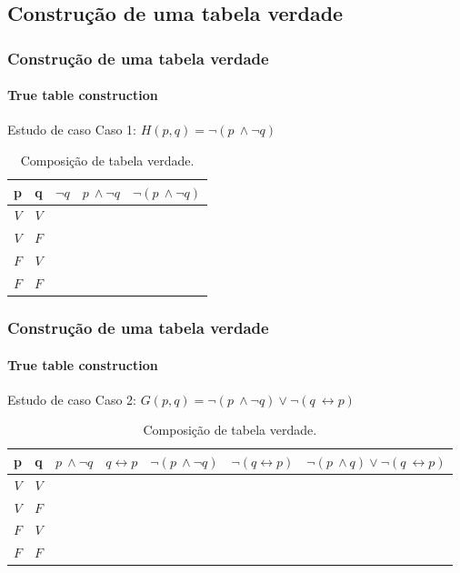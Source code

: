 \subsection{Construção de uma tabela verdade}
%
{
\begin{frame}[t]
    \frametitle{Construção de uma tabela verdade}
    \framesubtitle{True table construction}
    \begin{exampleblock}{Estudo de caso}
        Caso 1: $H(p,q) = \lnot (p~\land \lnot q)$
    \end{exampleblock}
    \begin{table}[T]
        \caption{Composição de tabela verdade.}
        \label{tab:tabela-caso-1}
        \begin{tabular}{|c|c|c|l|l|}
            \hline
            \rowcolor[HTML]{EFEFEF} 
            \textbf{p} & \textbf{q} & \textbf{$\lnot q$} & \textbf{$p~\land \lnot q$} & \textbf{$\lnot (p~\land \lnot q)$} \\ \hline
            $V$ & $V$ &  &  &  \\ \hline
            $V$ & $F$ &  &  &  \\ \hline
            $F$ & $V$ &  &  &  \\ \hline
            $F$ & $F$ &  &  &  \\ \hline
        \end{tabular}
    \end{table}
\end{frame}
}
%
\begin{frame}[t]
    \frametitle{Construção de uma tabela verdade}
    \framesubtitle{True table construction}
    \begin{exampleblock}{Estudo de caso}
        Caso 2: $G(p,q) = \lnot (p~\land \lnot q) \lor \lnot (q~\leftrightarrow p)$
    \end{exampleblock}
    \begin{table}[ht]
        \footnotesize
        \caption{Composição de tabela verdade.}
        \label{tab:tabela-caso-2}
        \begin{tabular}{|c|c|c|l|l|l|l|}
            \hline
            \rowcolor[HTML]{EFEFEF} 
            \textbf{p} &
            \textbf{q} &
            \textbf{$p~\land \lnot q$} &
            \textbf{$q \leftrightarrow p$} &
            \textbf{$\lnot (p~\land \lnot q)$} &
            \textbf{$\lnot (q \leftrightarrow p)$} &
            \textbf{$\lnot (p~\land q) \lor \lnot (q~\leftrightarrow p)$} \\ \hline
            $V$ & $V$ &  &  &  &  &  \\ \hline
            $V$ & $F$ &  &  &  &  &  \\ \hline
            $F$ & $V$ &  &  &  &  &  \\ \hline
            $F$ & $F$ &  &  &  &  &  \\ \hline
        \end{tabular}
    \end{table}
\end{frame}
%